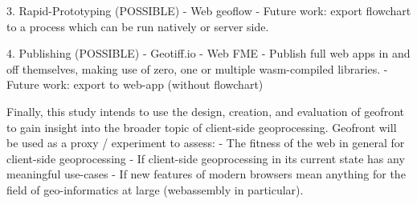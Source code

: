 3. Rapid-Prototyping (POSSIBLE)
   - Web geoflow
   - Future work: export flowchart to a process which can be run natively or server side.

4. Publishing (POSSIBLE)
   - Geotiff.io
   - Web FME 
   - Publish full web apps in and off themselves, making use of zero, one or multiple wasm-compiled libraries.  
   - Future work: export to web-app (without flowchart)


Finally, this study intends to use the design, creation, and evaluation of geofront to gain insight into the broader topic of client-side geoprocessing. 
Geofront will be used as a proxy / experiment to assess: 
- The fitness of the web in general for client-side geoprocessing
- If client-side geoprocessing in its current state has any meaningful use-cases
- If new features of modern browsers mean anything for the field of geo-informatics at large (webassembly in particular). 















